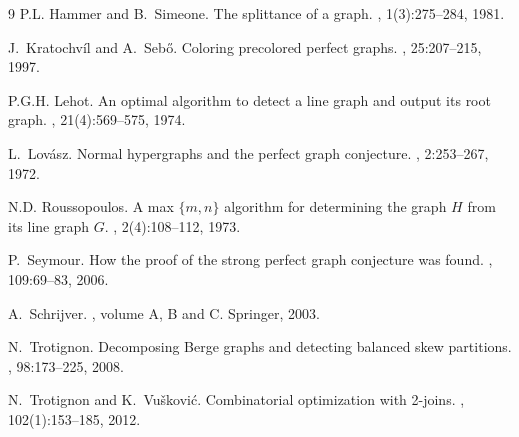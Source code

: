 \documentclass[11 pt] {article}
\begin{document}
\begin {thebibliography}{9}
P.L. Hammer and B.~Simeone.
\newblock The splittance of a graph.
, 1(3):275--284, 1981.

J.~Kratochv{\'i}l and A.~Seb{\H o}.
\newblock Coloring precolored perfect graphs.
, 25:207--215, 1997.



P.G.H. Lehot.
\newblock An optimal algorithm to detect a line graph and output its root
  graph.
,
  21(4):569--575, 1974.

L.~Lov{\'a}sz.
\newblock Normal hypergraphs and the perfect graph conjecture.
, 2:253--267, 1972.

N.D. Roussopoulos.
\newblock A max $\{m, n\}$ algorithm for determining the graph {$H$} from its
  line graph {$G$}.
, 2(4):108--112, 1973.

P.~Seymour.
\newblock How the proof of the strong perfect graph conjecture was found.
, 109:69--83, 2006.

A.~Schrijver.
, volume A,
  B and C.
\newblock Springer, 2003.

N.~Trotignon.
\newblock Decomposing {B}erge graphs and detecting balanced skew partitions.
, 98:173--225, 2008.


N.~Trotignon and K.~Vu{\v s}kovi{\'c}.
\newblock Combinatorial optimization with 2-joins.
, 102(1):153--185,
  2012.
\end{thebibliography}
\end{document}
